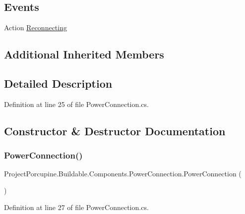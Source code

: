 \subsection*{Events}
\begin{DoxyCompactItemize}
\item 
Action \hyperlink{class_project_porcupine_1_1_buildable_1_1_components_1_1_power_connection_a33e21a0f2297ee283bb3f269a1b96491}{Reconnecting}
\end{DoxyCompactItemize}
\subsection*{Additional Inherited Members}


\subsection{Detailed Description}


Definition at line 25 of file Power\+Connection.\+cs.



\subsection{Constructor \& Destructor Documentation}
\mbox{\label{class_project_porcupine_1_1_buildable_1_1_components_1_1_power_connection_ae727434973fd543484fb71b8bceca5e1}} 
\subsubsection{\texorpdfstring{Power\+Connection()}{PowerConnection()}}
{\footnotesize\ttfamily Project\+Porcupine.\+Buildable.\+Components.\+Power\+Connection.\+Power\+Connection (\begin{DoxyParamCaption}{ }\end{DoxyParamCaption})}



Definition at line 27 of file Power\+Connection.\+cs.




